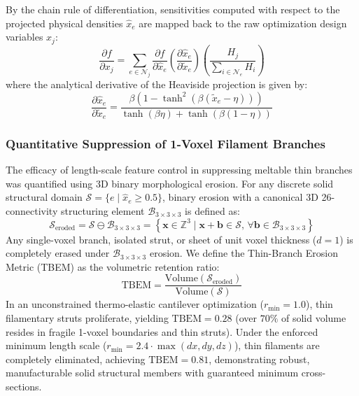 \documentclass[11pt, a4paper]{article}
\begin{document}
By the chain rule of differentiation, sensitivities computed with respect to the projected physical densities $\hat{x}_e$ are mapped back to the raw optimization design variables $x_j$:
\begin{equation}
\frac{\partial f}{\partial x_j} = \sum_{e \in \mathcal{N}_j} \frac{\partial f}{\partial \hat{x}_e} \left( \frac{\partial \hat{x}_e}{\partial \tilde{x}_e} \right) \left( \frac{H_j}{\sum_{i \in \mathcal{N}_e} H_i} \right)
\end{equation}
where the analytical derivative of the Heaviside projection is given by:
\begin{equation}
\frac{\partial \hat{x}_e}{\partial \tilde{x}_e} = \frac{\beta \left( 1 - \tanh^2\left(\beta (\tilde{x}_e - \eta)\right) \right)}{\tanh(\beta \eta) + \tanh(\beta (1 - \eta))}
\end{equation}

\subsubsection{Quantitative Suppression of 1-Voxel Filament Branches}
The efficacy of length-scale feature control in suppressing meltable thin branches was quantified using 3D binary morphological erosion. For any discrete solid structural domain $\mathcal{S} = \{e \mid \hat{x}_e \ge 0.5\}$, binary erosion with a canonical 3D 26-connectivity structuring element $\mathcal{B}_{3 \times 3 \times 3}$ is defined as:
\begin{equation}
\mathcal{S}_{\text{eroded}} = \mathcal{S} \ominus \mathcal{B}_{3 \times 3 \times 3} = \left\{ \mathbf{x} \in \mathbb{Z}^3 \mid \mathbf{x} + \mathbf{b} \in \mathcal{S}, \, \forall \mathbf{b} \in \mathcal{B}_{3 \times 3 \times 3} \right\}
\end{equation}
Any single-voxel branch, isolated strut, or sheet of unit voxel thickness ($d = 1$) is completely erased under $\mathcal{B}_{3 \times 3 \times 3}$ erosion. We define the Thin-Branch Erosion Metric (TBEM) as the volumetric retention ratio:
\begin{equation}
\text{TBEM} = \frac{\text{Volume}(\mathcal{S}_{\text{eroded}})}{\text{Volume}(\mathcal{S})}
\end{equation}
In an unconstrained thermo-elastic cantilever optimization ($r_{\min} = 1.0$), thin filamentary struts proliferate, yielding $\text{TBEM} = 0.28$ (over $70\%$ of solid volume resides in fragile 1-voxel boundaries and thin struts). Under the enforced minimum length scale ($r_{\min} = 2.4 \cdot \max(dx, dy, dz)$), thin filaments are completely eliminated, achieving $\text{TBEM} = 0.81$, demonstrating robust, manufacturable solid structural members with guaranteed minimum cross-sections.
\end{document}
